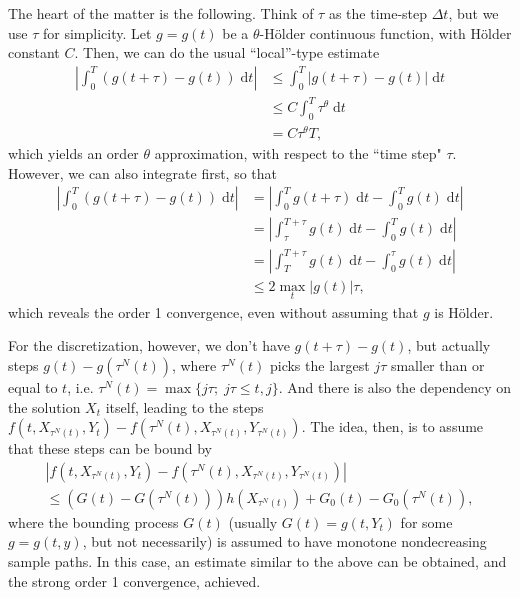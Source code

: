 \documentclass[reqno,12pt]{amsart}
\theoremstyle{plain}%
\theoremstyle{definition}
\begin{document}
The heart of the matter is the following. Think of $\tau$ as the time-step $\Delta t$, but we use $\tau$ for simplicity. Let $g=g(t)$ be a $\theta$-H\"older continuous function, with H\"older constant $C$. Then, we can do the usual ``local''-type estimate
\begin{align*}
    \left|\int_0^T \left(g(t + \tau) - g(t) \right) \;\mathrm{d}t \right| & \leq \int_0^T \left|g(t + \tau) - g(t) \right| \;\mathrm{d}t \\
    & \leq C\int_0^T \tau^{\theta} \;\mathrm{d}t \\
    & = C\tau^{\theta}T,
\end{align*}
which yields an order $\theta$ approximation, with respect to the ``time step" $\tau$. However, we can also integrate first, so that
\begin{align*}
    \left|\int_0^T \left(g(t + \tau) - g(t) \right) \;\mathrm{d}t \right| & = \left|\int_0^T g(t + \tau) \;\mathrm{d}t - \int_0^T g(t) \;\mathrm{d}t \right| \\ 
    & = \left| \int_\tau^{T+\tau} g(t) \;\mathrm{d}t - \int_0^T g(t) \;\mathrm{d}t \right| \\
    & = \left| \int_T^{T+\tau} g(t) \;\mathrm{d}t - \int_0^\tau g(t) \;\mathrm{d}t \right| \\
    & \leq 2\max_t|g(t)| \tau,
\end{align*}
which reveals the order 1 convergence, even without assuming that $g$ is H\"older.

For the discretization, however, we don't have $g(t+\tau) - g(t)$, but actually steps $g(t) - g(\tau^N(t))$, where $\tau^N(t)$ picks the largest $j\tau$ smaller than or equal to $t$, i.e. $\tau^N(t) = \max\{j\tau; \; j\tau \leq t, j\}$. And there is also the dependency on the solution $X_t$ itself, leading to the steps $f(t, X_{\tau^N(t)}, Y_t) - f(\tau^N(t), X_{\tau^N(t)}, Y_{\tau^N(t)})$. The idea, then, is to assume that these steps can be bound by
\begin{multline*}
  |f(t, X_{\tau^N(t)}, Y_t) - f(\tau^N(t), X_{\tau^N(t)}, Y_{\tau^N(t)})| \\
  \leq (G(t) - G(\tau^N(t)))h(X_{\tau^N(t)}) + G_0(t) - G_0(\tau^N(t)),
\end{multline*}
where the bounding process $G(t)$ (usually $G(t) = g(t, Y_t)$ for some $g=g(t, y)$, but not necessarily) is assumed to have monotone nondecreasing sample paths. In this case, an estimate similar to the above can be obtained, and the strong order 1 convergence, achieved.
\end{document}
